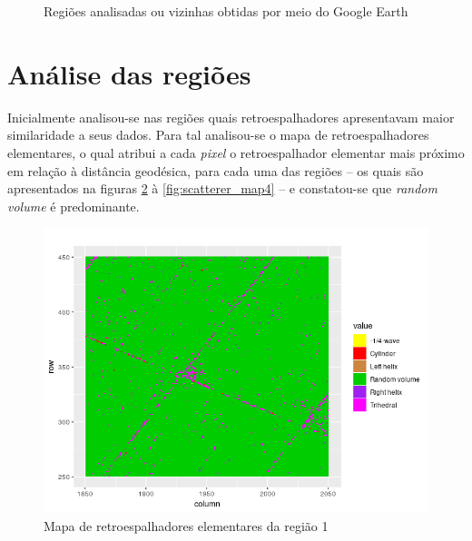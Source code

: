 \documentclass[12pt]{article}
\begin{document}
\begin{figure}[hbt]
    \qquad
    \caption{Regiões analisadas ou vizinhas obtidas por meio do Google Earth}
    \label{fig:regions_google_earth}
\end{figure}



\section{Análise das regiões}

Inicialmente analisou-se nas regiões quais retroespalhadores apresentavam maior similaridade a seus dados. Para tal analisou-se o mapa de retroespalhadores elementares, o qual atribui a cada \textit{pixel} o retroespalhador elementar mais próximo em relação à distância geodésica, para cada uma das regiões -- os quais são apresentados na figuras \ref{fig:scatterer_map1} à \ref{fig:scatterer_map4} -- e constatou-se que \textit{random volume} é predominante.

\begin{figure}[!h]

  \centering
  \includegraphics[width=\linewidth]{../../Images/Report_19_02_27/scatterer_map_region1.png}
  \caption{Mapa de retroespalhadores elementares da região 1}
  \label{fig:scatterer_map1}

\end{figure}
\end{document}
